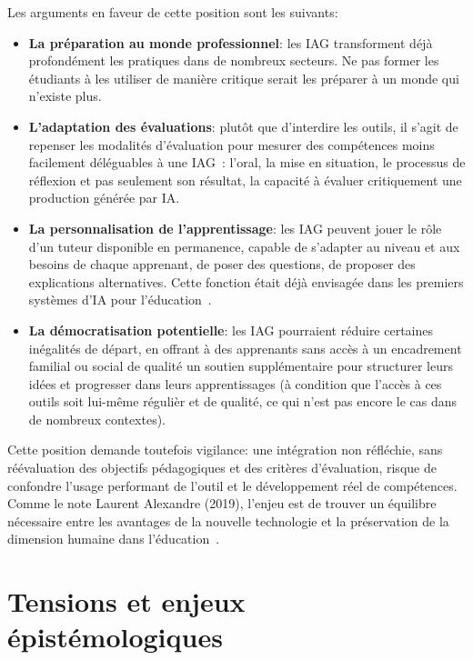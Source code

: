Les arguments en faveur de cette position sont les suivants:

\begin{itemize}
    \item \textbf{La pr\'eparation au monde professionnel}: les IAG transforment d\'ej\`a profond\'ement les pratiques dans de nombreux secteurs. 
    Ne pas former les \'etudiants \`a les utiliser de mani\`ere critique serait les pr\'eparer \`a un monde qui n'existe plus.
    \item \textbf{L'adaptation des \'evaluations}: plut\^ot que d'interdire les outils, il s'agit de repenser les modalit\'es d'\'evaluation pour mesurer des comp\'etences moins facilement d\'el\'eguables \`a une IAG~: l'oral, la mise en situation, le processus de r\'eflexion et pas seulement son r\'esultat, la capacit\'e \`a \'evaluer critiquement une production g\'en\'er\'ee par IA.\@
    \item \textbf{La personnalisation de l'apprentissage}: les IAG peuvent jouer le r\^ole d'un tuteur disponible en permanence, capable de s'adapter au niveau et aux besoins de chaque apprenant, de poser des questions, de proposer des explications alternatives. 
    Cette fonction \'etait d\'ej\`a envisag\'ee dans les premiers syst\`emes d'IA pour l'\'education~\cite{jabraoui2024}.
    \item \textbf{La d\'emocratisation potentielle}: les IAG pourraient r\'eduire certaines in\'egalit\'es de d\'epart, en offrant \`a des apprenants sans acc\`es \`a un encadrement familial ou social de qualit\'e un soutien suppl\'ementaire pour structurer leurs id\'ees et progresser dans leurs apprentissages (\`a condition que l'acc\`es \`a ces outils soit lui-m\^eme r\'eguli\`er et de qualit\'e, ce qui n'est pas encore le cas dans de nombreux contextes).
\end{itemize}

Cette position demande toutefois vigilance: une int\'egration non r\'efl\'echie, sans r\'e\'evaluation des objectifs p\'edagogiques et des crit\`eres d'\'evaluation, risque de confondre l'usage performant de l'outil et le d\'eveloppement r\'eel de comp\'etences. 
Comme le note Laurent Alexandre (2019), l'enjeu est de \og{}trouver un \'equilibre n\'ecessaire entre les avantages de la nouvelle technologie et la pr\'eservation de la dimension humaine dans l'\'education\fg{}~\cite{alexandre2019}.


\newpage
\section{Tensions et enjeux \'epist\'emologiques}\label{sec:tensions}

